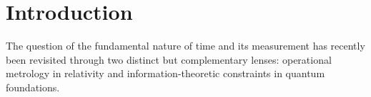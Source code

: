 \documentclass[entropy,article,submit,moreauthors,pdftex]{Definitions/mdpi}
\DeclareMathOperator{\sign}{sign}
\begin{document}
%
%
%
%
%
%
%
%
%
%
%
%

\section{Introduction}

The question of the fundamental nature of time and its measurement has recently been revisited through two distinct but complementary lenses: operational metrology in relativity and information-theoretic constraints in quantum foundations.
\end{document}

